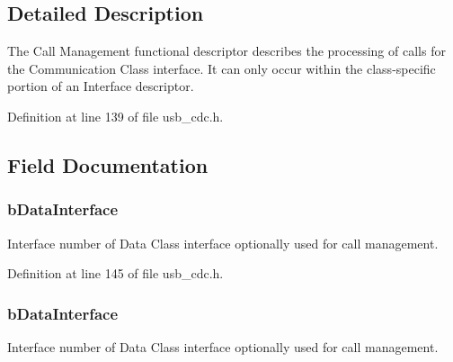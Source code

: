 \subsection{Detailed Description}
The Call Management functional descriptor describes the processing of calls for the Communication Class interface. It can only occur within the class-\/specific portion of an Interface descriptor. 

Definition at line 139 of file usb\-\_\-cdc.\-h.



\subsection{Field Documentation}
\hypertarget{struct_u_s_b___call___management___functional___descriptor_a856be28e5decda9135c9b148a4897716}{
\subsubsection[{b\-Data\-Interface}]{ b\-Data\-Interface}}\label{struct_u_s_b___call___management___functional___descriptor_a856be28e5decda9135c9b148a4897716}
Interface number of Data Class interface optionally used for call management. 

Definition at line 145 of file usb\-\_\-cdc.\-h.

\hypertarget{struct_u_s_b___call___management___functional___descriptor_a2421f58aab92b2ac70e7c4f9f57fc971}{
\subsubsection[{b\-Data\-Interface}]{ b\-Data\-Interface}}\label{struct_u_s_b___call___management___functional___descriptor_a2421f58aab92b2ac70e7c4f9f57fc971}
Interface number of Data Class interface optionally used for call management. 


